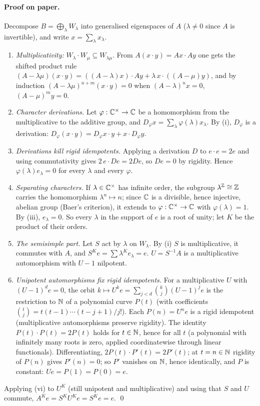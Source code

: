\paragraph{Proof on paper.}  Decompose $B=\bigoplus_\lambda W_\lambda$ into generalised eigenspaces of $A$ ($\lambda\neq0$
since $A$ is invertible), and write $x=\sum_\lambda x_\lambda$.
\begin{enumerate}[label=(\roman*)]
\item \emph{Multiplicativity:} $W_\lambda\cdot W_\mu\subseteq W_{\lambda\mu}$.  From $A(x\cdot y)=Ax\cdot Ay$ one gets the
  shifted product rule $(A-\lambda\mu)(x\cdot y)=((A-\lambda)x)\cdot Ay+\lambda\,x\cdot((A-\mu)y)$, and by induction
  $(A-\lambda\mu)^{n+m}(x\cdot y)=0$ when $(A-\lambda)^nx=0$, $(A-\mu)^my=0$.
\item \emph{Character derivations.}  Let $\varphi:{\mathbb{C}}^\times\to{\mathbb{C}}$ be a homomorphism from the multiplicative to the
  additive group, and $D_\varphi x=\sum_\lambda\varphi(\lambda)x_\lambda$.  By (i), $D_\varphi$ is a derivation:
  $D_\varphi(x\cdot y)=D_\varphi x\cdot y+x\cdot D_\varphi y$.
\item \emph{Derivations kill rigid idempotents.}  Applying a derivation $D$ to $e\cdot e=2e$ and using commutativity gives
  $2\,e\cdot De=2De$, so $De=0$ by rigidity.  Hence $\varphi(\lambda)e_\lambda=0$ for every $\lambda$ and every $\varphi$.
\item \emph{Separating characters.}  If $\lambda\in{\mathbb{C}}^\times$ has infinite order, the subgroup $\lambda^{\mathbb{Z}}\cong{\mathbb{Z}}$ carries the
  homomorphism $\lambda^n\mapsto n$; since ${\mathbb{C}}$ is a divisible, hence injective, abelian group (Baer's criterion), it
  extends to $\varphi:{\mathbb{C}}^\times\to{\mathbb{C}}$ with $\varphi(\lambda)=1$.  By (iii), $e_\lambda=0$.  So every $\lambda$ in the support
  of $e$ is a root of unity; let $K$ be the product of their orders.
\item \emph{The semisimple part.}  Let $S$ act by $\lambda$ on $W_\lambda$.  By (i) $S$ is multiplicative, it commutes with
  $A$, and $S^Ke=\sum\lambda^Ke_\lambda=e$.  $U=S^{-1}A$ is a multiplicative automorphism with $U-1$ nilpotent.
\item \emph{Unipotent automorphisms fix rigid idempotents.}  For a multiplicative $U$ with $(U-1)^de=0$, the orbit
  $k\mapsto U^ke=\sum_{j<d}\binom kj(U-1)^je$ is the restriction to ${\mathbb{N}}$ of a polynomial curve $P(t)$ (with coefficients
  $\binom tj=t(t-1)\cdots(t-j+1)/j!$).  Each $P(n)=U^ne$ is a rigid idempotent (multiplicative automorphisms preserve
  rigidity).  The identity $P(t)\cdot P(t)=2P(t)$ holds for $t\in{\mathbb{N}}$, hence for all $t$ (a polynomial with infinitely many
  roots is zero, applied coordinatewise through linear functionals).  Differentiating, $2P(t)\cdot P'(t)=2P'(t)$; at
  $t=n\in{\mathbb{N}}$ rigidity of $P(n)$ gives $P'(n)=0$; so $P'$ vanishes on ${\mathbb{N}}$, hence identically, and $P$ is constant:
  $Ue=P(1)=P(0)=e$.
\end{enumerate}
Applying (vi) to $U^K$ (still unipotent and multiplicative) and using that $S$ and $U$ commute,
$A^Ke=S^KU^Ke=S^Ke=e$. \qed

